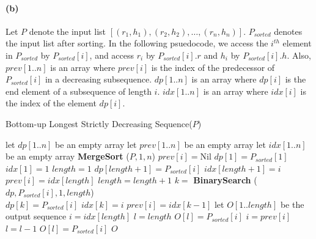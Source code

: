 \documentclass[12pt]{article}
\begin{document}
\paragraph{(b)} Let \(P\) denote the input list \([(r_1,h_1), (r_2,h_2), \hdots, (r_n,h_n)]\). \(P_{sorted}\) denotes the input list after sorting. In the following psuedocode, we access the \(i^{th}\) element in \(P_{sorted}\) by \(P_{sorted}[i]\), and access \(r_i\) by \(P_{sorted}[i].r\) and  \(h_i\) by \(P_{sorted}[i].h\). Also, \(prev[1..n]\) is an array where \(prev[i]\) is the index of the predecessor of \(P_{sorted}[i]\) in a decreasing subsequence. \(dp[1..n]\) is an array where \(dp[i]\) is the end element of a subsequence of length \(i\). \(idx[1..n]\) is an array where \(idx[i]\) is the index of the element \(dp[i]\).
\begin{algorithm}[H]
     \caption{Bottom-up Longest Strictly Decreasing Sequence(\(P\))}
     \begin{algorithmic}[1]
     \State let \(dp[1..n]\) be an empty array 
     \State let \(prev[1..n]\) be an empty array
     \State let \(idx[1..n]\) be an empty array
     \State \textbf{MergeSort} (\(P, 1, n\))
          \State \(prev[i] = \text{Nil}\)
     \EndFor
     \State \(dp[1] = P_{sorted}[1]\) 
     \State \(idx[1] = 1\)
     \State \(length = 1\) 
           
               \State \(dp[length+1] = P_{sorted}[i]\)
               \State \(idx[length+1] = i\)
               \State \(prev[i] = idx[length]\)
               \State \(length = length + 1\)
          \Else
               \State \(k =\) \textbf{BinarySearch} (\(dp, P_{sorted}[i], 1, length\)) \\
                    \State \(dp[k] = P_{sorted}[i]\) 
                    \State \(idx[k] = i\)
                     
                         \State \(prev[i] = idx[k-1]\)
                    \EndIf
               \EndIf
          \EndIf
     \EndFor
     \State let \(O[1..length]\) be the output sequence
     \State \(i = idx[length]\) 
     \State \(l = length\)
      
          \State \(O[l] = P_{sorted}[i]\)
          \State \(i = prev[i]\)
          \State \(l = l - 1\)
     \EndWhile
     \State \(O[l] = P_{sorted}[i]\)
     \State \Return \(O\)
     \end{algorithmic}
\end{algorithm}
\end{document}
